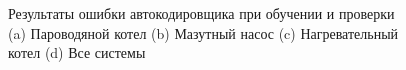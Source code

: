 \begin{figure}[H]
  \centering
  \caption{Результаты ошибки автокодировщика при обучении и проверки\\(a)
  Пароводяной котел (b) Мазутный насос (c) Нагревательный котел (d) Все
  системы}\label{fig:test:plot:learning:encoder}
\end{figure}

